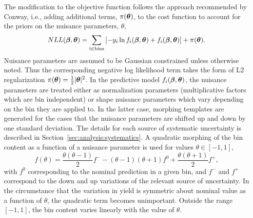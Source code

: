 The modification to the objective function follows the approach recommended by Conway, i.e., adding additional terms, $\pi(\boldsymbol{\theta})$, to the cost function to account for the priors on the nuisance parameters, $\theta$,
\begin{equation}
\label{eqn:analysis:method:mel_nll_full}
    NLL(\boldsymbol{\beta}, \boldsymbol{\theta}) = \sum_{\mathrm{i \in bins}} \left[-y_{i}\ln f_{i}(\boldsymbol{\beta}, \boldsymbol{\theta}) + f_{i}(\boldsymbol{\beta}, \boldsymbol{\theta})\right] + \pi(\boldsymbol{\theta}).
\end{equation}
Nuisance parameters are assumed to be Gaussian constrained unless otherwise noted. Thus the corresponding negative log likelihood term takes the form of L2 regularization $\pi(\boldsymbol{\theta}) = \frac{1}{2} \lvert \boldsymbol{\theta} \rvert^2$. In the predictive model $f_{i}(\boldsymbol{\beta}, \boldsymbol{\theta})$, the nuisance parameters are treated either as normalization parameters (multiplicative factors which are bin independent) or shape nuisance parameters which vary depending on the bin they are applied to.  In the latter case, morphing templates are generated for the cases that the nuisance parameters are shifted up and down by one standard deviation. The details for each source of systematic uncertainty is described in Section~\ref{sec:analysis:systematics}. A quadratic morphing of the bin content as a function of a nuisance parameter is used for values $\theta \in [-1, 1]$,
\begin{equation}
\label{eqn:analysis:method:shape_param}
    f(\theta) = \frac{\theta(\theta - 1)}{2}f^{-} - (\theta - 1)(\theta +1)f^{0} + \frac{\theta(\theta + 1)}{2}f^{+},
\end{equation}
\noindent with $f^{0}$ corresponding to the nominal prediction in a given bin, and $f^{-}$ and $f^{+}$ correspond to the down and up variations of the relevant source of uncertainty. In the circumstance that the variation in yield is symmetric about nominal value as a function of $\theta$, the quadratic term becomes unimportant.  Outside the range $[-1, 1]$, the bin content varies linearly with the value of $\theta$.



